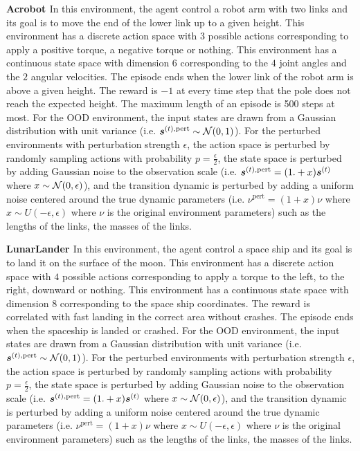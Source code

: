 \textbf{Acrobot \citep{acrobot1, acrobot2}} In this environment, the agent control a robot arm with two links and its goal is to move the end of the lower link up to a given height. This environment has a discrete action space with $3$ possible actions corresponding to apply a positive torque, a negative torque or nothing. This environment has a continuous state space with dimension $6$ corresponding to the $4$ joint angles and the $2$ angular velocities. The episode ends when the lower link of the robot arm is above a given height. The reward is $-1$ at every time step that the pole does not reach the expected height. The maximum length of an episode is 500 steps at most. For the OOD environment, the input states are drawn from a Gaussian distribution with unit variance (i.e. $\bm{s}^{(t), \text{pert}} \sim \operatorname{\mathcal{N}}(0, 1)$). For the perturbed environments with perturbation strength $\epsilon$, the action space is perturbed by randomly sampling actions with probability $p=\frac{\epsilon}{2}$, the state space is perturbed by adding Gaussian noise to the observation scale (i.e. $\bm{s}^{(t), \text{pert}} = (1. + x)\bm{s}^{(t)}$ where $x \sim \operatorname{\mathcal{N}}(0, \epsilon)$), and the transition dynamic is perturbed by adding a uniform noise centered around the true dynamic parameters (i.e. $\nu^{\text{pert}} = (1 + x) \nu$ where $x \sim U(-\epsilon, \epsilon)$ where $\nu$ is the original environment parameters) such as the lengths of the links, the masses of the links.

\textbf{LunarLander \citep{lunarlander1}} In this environment, the agent control a space ship and its goal is to land it on the surface of the moon. This environment has a discrete action space with $4$ possible actions corresponding to apply a torque to the left, to the right, downward or nothing. This environment has a continuous state space with dimension $8$ corresponding to the space ship coordinates. The reward is correlated with fast landing in the correct area without crashes. The episode ends when the spaceship is landed or crashed. For the OOD environment, the input states are drawn from a Gaussian distribution with unit variance (i.e. $\bm{s}^{(t), \text{pert}} \sim \operatorname{\mathcal{N}}(0, 1)$). For the perturbed environments with perturbation strength $\epsilon$, the action space is perturbed by randomly sampling actions with probability $p=\frac{\epsilon}{2}$, the state space is perturbed by adding Gaussian noise to the observation scale (i.e. $\bm{s}^{(t), \text{pert}} = (1. + x)\bm{s}^{(t)}$ where $x \sim \operatorname{\mathcal{N}}(0, \epsilon)$), and the transition dynamic is perturbed by adding a uniform noise centered around the true dynamic parameters (i.e. $\nu^{\text{pert}} = (1 + x) \nu$ where $x \sim U(-\epsilon, \epsilon)$ where $\nu$ is the original environment parameters) such as the lengths of the links, the masses of the links.

